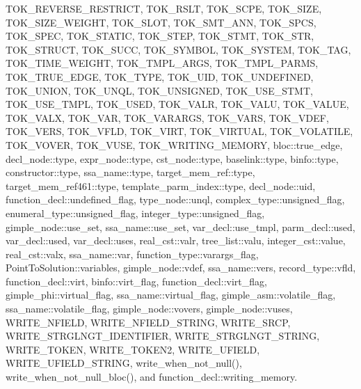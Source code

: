 T\+O\+K\+\_\+\+R\+E\+V\+E\+R\+S\+E\+\_\+\+R\+E\+S\+T\+R\+I\+CT, T\+O\+K\+\_\+\+R\+S\+LT, T\+O\+K\+\_\+\+S\+C\+PE, T\+O\+K\+\_\+\+S\+I\+ZE, T\+O\+K\+\_\+\+S\+I\+Z\+E\+\_\+\+W\+E\+I\+G\+HT, T\+O\+K\+\_\+\+S\+L\+OT, T\+O\+K\+\_\+\+S\+M\+T\+\_\+\+A\+NN, T\+O\+K\+\_\+\+S\+P\+CS, T\+O\+K\+\_\+\+S\+P\+EC, T\+O\+K\+\_\+\+S\+T\+A\+T\+IC, T\+O\+K\+\_\+\+S\+T\+EP, T\+O\+K\+\_\+\+S\+T\+MT, T\+O\+K\+\_\+\+S\+TR, T\+O\+K\+\_\+\+S\+T\+R\+U\+CT, T\+O\+K\+\_\+\+S\+U\+CC, T\+O\+K\+\_\+\+S\+Y\+M\+B\+OL, T\+O\+K\+\_\+\+S\+Y\+S\+T\+EM, T\+O\+K\+\_\+\+T\+AG, T\+O\+K\+\_\+\+T\+I\+M\+E\+\_\+\+W\+E\+I\+G\+HT, T\+O\+K\+\_\+\+T\+M\+P\+L\+\_\+\+A\+R\+GS, T\+O\+K\+\_\+\+T\+M\+P\+L\+\_\+\+P\+A\+R\+MS, T\+O\+K\+\_\+\+T\+R\+U\+E\+\_\+\+E\+D\+GE, T\+O\+K\+\_\+\+T\+Y\+PE, T\+O\+K\+\_\+\+U\+ID, T\+O\+K\+\_\+\+U\+N\+D\+E\+F\+I\+N\+ED, T\+O\+K\+\_\+\+U\+N\+I\+ON, T\+O\+K\+\_\+\+U\+N\+QL, T\+O\+K\+\_\+\+U\+N\+S\+I\+G\+N\+ED, T\+O\+K\+\_\+\+U\+S\+E\+\_\+\+S\+T\+MT, T\+O\+K\+\_\+\+U\+S\+E\+\_\+\+T\+M\+PL, T\+O\+K\+\_\+\+U\+S\+ED, T\+O\+K\+\_\+\+V\+A\+LR, T\+O\+K\+\_\+\+V\+A\+LU, T\+O\+K\+\_\+\+V\+A\+L\+UE, T\+O\+K\+\_\+\+V\+A\+LX, T\+O\+K\+\_\+\+V\+AR, T\+O\+K\+\_\+\+V\+A\+R\+A\+R\+GS, T\+O\+K\+\_\+\+V\+A\+RS, T\+O\+K\+\_\+\+V\+D\+EF, T\+O\+K\+\_\+\+V\+E\+RS, T\+O\+K\+\_\+\+V\+F\+LD, T\+O\+K\+\_\+\+V\+I\+RT, T\+O\+K\+\_\+\+V\+I\+R\+T\+U\+AL, T\+O\+K\+\_\+\+V\+O\+L\+A\+T\+I\+LE, T\+O\+K\+\_\+\+V\+O\+V\+ER, T\+O\+K\+\_\+\+V\+U\+SE, T\+O\+K\+\_\+\+W\+R\+I\+T\+I\+N\+G\+\_\+\+M\+E\+M\+O\+RY, bloc\+::true\+\_\+edge, decl\+\_\+node\+::type, expr\+\_\+node\+::type, cst\+\_\+node\+::type, baselink\+::type, binfo\+::type, constructor\+::type, ssa\+\_\+name\+::type, target\+\_\+mem\+\_\+ref\+::type, target\+\_\+mem\+\_\+ref461\+::type, template\+\_\+parm\+\_\+index\+::type, decl\+\_\+node\+::uid, function\+\_\+decl\+::undefined\+\_\+flag, type\+\_\+node\+::unql, complex\+\_\+type\+::unsigned\+\_\+flag, enumeral\+\_\+type\+::unsigned\+\_\+flag, integer\+\_\+type\+::unsigned\+\_\+flag, gimple\+\_\+node\+::use\+\_\+set, ssa\+\_\+name\+::use\+\_\+set, var\+\_\+decl\+::use\+\_\+tmpl, parm\+\_\+decl\+::used, var\+\_\+decl\+::used, var\+\_\+decl\+::uses, real\+\_\+cst\+::valr, tree\+\_\+list\+::valu, integer\+\_\+cst\+::value, real\+\_\+cst\+::valx, ssa\+\_\+name\+::var, function\+\_\+type\+::varargs\+\_\+flag, Point\+To\+Solution\+::variables, gimple\+\_\+node\+::vdef, ssa\+\_\+name\+::vers, record\+\_\+type\+::vfld, function\+\_\+decl\+::virt, binfo\+::virt\+\_\+flag, function\+\_\+decl\+::virt\+\_\+flag, gimple\+\_\+phi\+::virtual\+\_\+flag, ssa\+\_\+name\+::virtual\+\_\+flag, gimple\+\_\+asm\+::volatile\+\_\+flag, ssa\+\_\+name\+::volatile\+\_\+flag, gimple\+\_\+node\+::vovers, gimple\+\_\+node\+::vuses, W\+R\+I\+T\+E\+\_\+\+N\+F\+I\+E\+LD, W\+R\+I\+T\+E\+\_\+\+N\+F\+I\+E\+L\+D\+\_\+\+S\+T\+R\+I\+NG, W\+R\+I\+T\+E\+\_\+\+S\+R\+CP, W\+R\+I\+T\+E\+\_\+\+S\+T\+R\+G\+L\+N\+G\+T\+\_\+\+I\+D\+E\+N\+T\+I\+F\+I\+ER, W\+R\+I\+T\+E\+\_\+\+S\+T\+R\+G\+L\+N\+G\+T\+\_\+\+S\+T\+R\+I\+NG, W\+R\+I\+T\+E\+\_\+\+T\+O\+K\+EN, W\+R\+I\+T\+E\+\_\+\+T\+O\+K\+E\+N2, W\+R\+I\+T\+E\+\_\+\+U\+F\+I\+E\+LD, W\+R\+I\+T\+E\+\_\+\+U\+F\+I\+E\+L\+D\+\_\+\+S\+T\+R\+I\+NG, write\+\_\+when\+\_\+not\+\_\+null(), write\+\_\+when\+\_\+not\+\_\+null\+\_\+bloc(), and function\+\_\+decl\+::writing\+\_\+memory.


